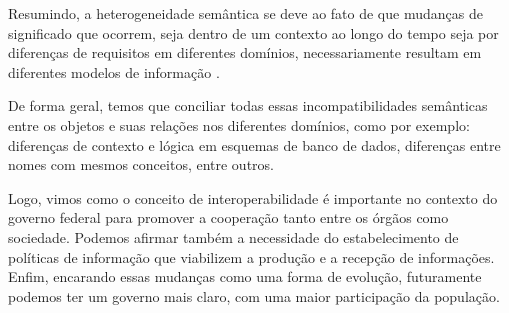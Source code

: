 Resumindo, a heterogeneidade semântica se deve ao fato de que mudanças de significado que ocorrem, seja dentro de um contexto ao longo do tempo seja por diferenças de requisitos em diferentes domínios, necessariamente resultam em diferentes modelos de informação \cite{kamada}.

De forma geral, temos que conciliar todas essas incompatibilidades semânticas entre os objetos e suas relações nos diferentes domínios, como por exemplo: diferenças de contexto e lógica em esquemas de banco de dados, diferenças entre nomes com mesmos conceitos, entre outros.

Logo, vimos como o conceito de interoperabilidade é importante no contexto do governo federal para promover a cooperação tanto entre os órgãos como sociedade. Podemos afirmar também a necessidade do estabelecimento de políticas de informação que viabilizem a produção e a recepção de informações. Enfim, encarando essas mudanças como uma forma de evolução, futuramente podemos ter um governo mais claro, com uma maior participação da população. 		
